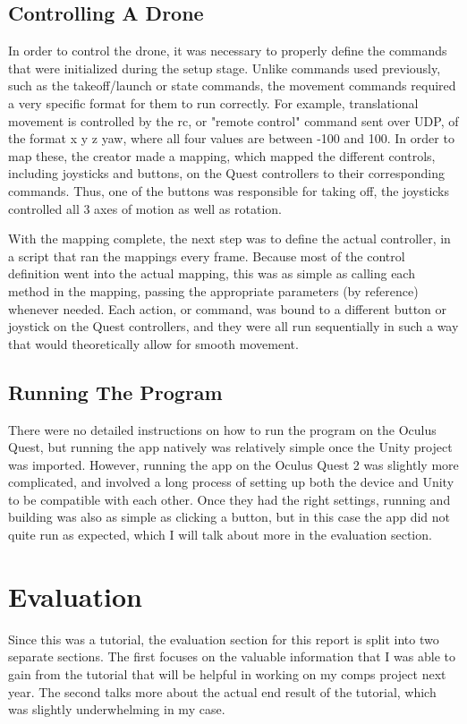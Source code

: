 \documentclass[10pt,twocolumn]{article}
\begin{document}
\subsection{Controlling A Drone}
In order to control the drone, it was necessary to properly define the commands that were initialized during the setup stage. Unlike commands used previously, such as the takeoff/launch or state commands, the movement commands required a very specific format for them to run correctly. For example, translational movement is controlled by the rc, or "remote control" command sent over UDP, of the format {x} {y} {z} {yaw}, where all four values are between -100 and 100. In order to map these, the creator made a mapping, which mapped the different controls, including joysticks and buttons, on the Quest controllers to their corresponding commands. Thus, one of the buttons was responsible for taking off, the joysticks controlled all 3 axes of motion as well as rotation.

With the mapping complete, the next step was to define the actual controller, in a script that ran the mappings every frame. Because most of the control definition went into the actual mapping, this was as simple as calling each method in the mapping, passing the appropriate parameters (by reference) whenever needed. Each action, or command, was bound to a different button or joystick on the Quest controllers, and they were all run sequentially in such a way that would theoretically allow for smooth movement.

\subsection{Running The Program}
There were no detailed instructions on how to run the program on the Oculus Quest, but running the app natively was relatively simple once the Unity project was imported. However, running the app on the Oculus Quest 2 was slightly more complicated, and involved a long process of setting up both the device and Unity to be compatible with each other. Once they had the right settings, running and building was also as simple as clicking a button, but in this case the app did not quite run as expected, which I will talk about more in the evaluation section.



\section{Evaluation}
Since this was a tutorial, the evaluation section for this report is split into two separate sections. The first focuses on the valuable information that I was able to gain from the tutorial that will be helpful in working on my comps project next year. The second talks more about the actual end result of the tutorial, which was slightly underwhelming in my case.
\end{document}
